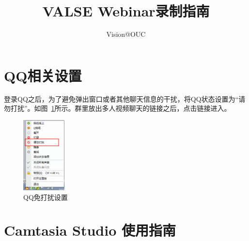 \documentclass[12pt]{article}
\begin{document}
\title{VALSE Webinar录制指南}
\author{Vision@OUC}
\maketitle\thispagestyle{fancy}
\maketitle
\section{QQ相关设置}
登录QQ之后，为了避免弹出窗口或者其他聊天信息的干扰，将QQ状态设置为“请勿打扰”。如图~\ref{qq}所示。群里放出多人视频聊天的链接之后，点击链接进入。
\begin{figure}[!ht]
\centering
\includegraphics[width=0.2\textwidth]{QQset.png}
\caption{QQ免打扰设置}
\label{qq}
\end{figure}


\section{Camtasia Studio 使用指南}
\end{document}
